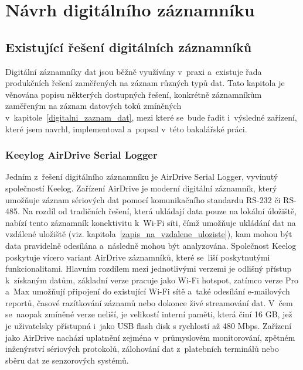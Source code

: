 \chapter{Návrh digitálního záznamníku}
\label{navrh_digitalniho_zaznamniku}

\section{Existující řešení digitálních záznamníků}
\label{existujici_reseni}
Digitální záznamníky dat jsou běžně využívány v~praxi a~existuje řada produkčních řešení zaměřených na záznam různých typů dat. Tato kapitola je věnována popisu některých dostupných řešení, konkrétně záznamníkům zaměřeným na záznam datových toků zmíněných v~kapitole~\ref{digitalni_zaznam_dat}, mezi které se~bude řadit i~výsledné zařízení, které jsem navrhl, implementoval a~popsal v~této bakalářské práci. 

\subsection{Keeylog AirDrive Serial Logger}
\label{keelog_airdrive_serial_datalogger}
Jedním z~řešení digitálního záznamníku je AirDrive Serial Logger, vyvinutý společností Keelog. Zařízení AirDrive je moderní digitální záznamník, který umožňuje záznam sériových dat pomocí komunikačního standardu RS-232 či RS-485. Na rozdíl od tradičních řešení, která ukládají data pouze na lokální úložiště, nabízí tento záznamník konektivitu k~Wi-Fi síti, čímž umožňuje ukládání dat na vzdálené uložiště (viz. kapitola~\ref{zapis_na_vzdalene_uloziste}), kam mohou být data pravidelně odesílána a~následně mohou být analyzována. Společnost Keelog poskytuje vícero variant AirDrive záznamníků, které se~liší poskytnutými funkcionalitami. Hlavním rozdílem mezi jednotlivými verzemi je odlišný přístup k~získaným datům, základní verze pracuje jako Wi-Fi hotspot, zatímco verze Pro a~Max umožňují připojení do existující Wi-Fi sítě a~také odesílání e-mailových reportů, časové razítkování záznamů nebo dokonce živé streamování dat. V~čem se~naopak zmíněné verze neliší, je velikostí interní paměti, která činí 16 GB, jež je uživatelsky přístupná i~jako USB flash disk s rychlostí až 480 Mbps. Zařízení jako AirDrive nachází uplatnění zejména v~průmyslovém monitorování, zpětném inženýrství sériových protokolů, zálohování dat z~platebních terminálů nebo sběru dat ze senzorových systémů.~\cite{keelog_airdrive_serial_datalogger, keelog_airdrive_serial_datalogger_max, keelog_airdrive_serial_datalogger_pro}


